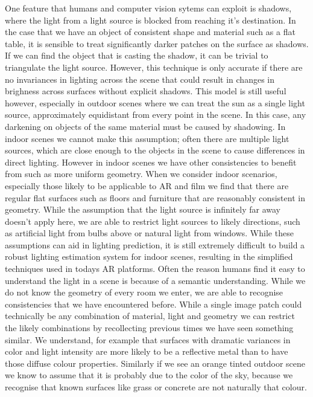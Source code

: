 \documentclass[ %
                    author={Gavin Parker},
                supervisor={Dr. Neill Campbell},
                    degree={MEng},
                     title={Deep Siamese Networks for Illumination Estimation from Stereo Images},
                  subtitle={},
                      type={research},
                      year={2018} ]{dissertation}
\begin{document}
One feature that humans and computer vision sytems can exploit is shadows, where the light from a light source is blocked from reaching it's destination. In the case that we have an object of consistent shape and material such as a flat table, it is sensible to treat significantly darker patches on the surface as shadows. If we can find the object that is casting the shadow, it can be trivial to triangulate the light source. However, this technique is only accurate if there are no invariances in lighting across the scene that could result in changes in brighness across surfaces without explicit shadows. This model is still useful however, especially in outdoor scenes where we can treat the sun as a single light source, approximately equidistant from every point in the scene. In this case, any darkening on objects of the same material must be caused by shadowing. In indoor scenes we cannot make this assumption; often there are multiple light sources, which are close enough to the objects in the scene to cause differences in direct lighting. However in indoor scenes we have other consistencies to benefit from such as more uniform geometry. When we consider indoor scenarios, especially those likely to be applicable to AR and film we find that there are regular flat surfaces such as floors and furniture that are reasonably consistent in geometry. While the assumption that the light source is infinitely far away doesn't apply here, we are able to restrict light sources to likely directions, such as artificial light from bulbs above or natural light from windows. While these assumptions can aid in lighting prediction, it is still extremely difficult to build a robust lighting estimation system for indoor scenes, resulting in the simplified techniques used in todays AR platforms.
\newline
Often the reason humans find it easy to understand the light in a scene is because of a semantic understanding. While we do not know the geometry of every room we enter, we are able to recognise consistencies that we have encountered before. While a single image patch could technically be any combination of material, light and geometry we can restrict the likely combinations by recollecting previous times we have seen something similar. We understand, for example that surfaces with dramatic variances in color and light intensity are more likely to be a reflective metal than to have those diffuse colour properties. Similarly if we see an orange tinted outdoor scene we know to assume that it is probably due to the color of the sky, because we recognise that known surfaces like grass or concrete are not naturally that colour.
\end{document}
